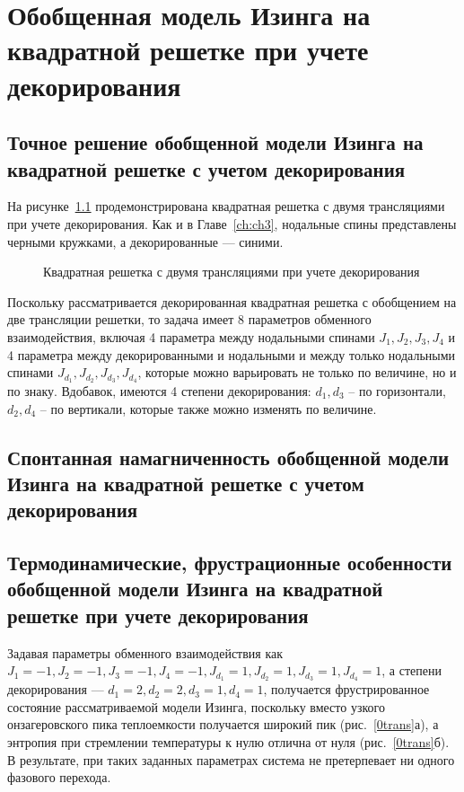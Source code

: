 \chapter{Обобщенная модель Изинга на квадратной решетке при учете декорирования}\label{ch:ch6}


\section{Точное решение обобщенной модели Изинга на квадратной решетке с учетом декорирования}

На рисунке~\ref{squareDecor} продемонстрирована квадратная решетка с двумя трансляциями при учете декорирования. Как и в Главе~\ref{ch:ch3}, нодальные спины представлены черными кружками, а декорированные --- синими. 

 \begin{figure}[h]
	\caption{Квадратная решетка с двумя трансляциями при учете декорирования}
	\label{squareDecor}
\end{figure}

Поскольку рассматривается декорированная квадратная решетка с обобщением на две трансляции решетки, то задача имеет 8 параметров обменного взаимодействия, включая 4 параметра между нодальными спинами $J_1, J_2, J_3, J_4$ и 4 параметра между декорированными и нодальными и между только нодальными спинами $J_{d_1}, J_{d_2}, J_{d_3}, J_{d_4}$, которые можно варьировать не только по величине, но и по знаку. Вдобавок, имеются 4 степени декорирования: $d_1, d_3$ -- по горизонтали, $d_2, d_4$ -- по вертикали, которые также можно изменять по величине. 


\section{Спонтанная намагниченность обобщенной модели Изинга на квадратной решетке с учетом декорирования}



\section{Термодинамические, фрустрационные особенности обобщенной модели Изинга на квадратной решетке при учете декорирования}

Задавая параметры обменного взаимодействия как $J_1 = -1, J_2 = -1, J_3 = -1, J_4 = -1, J_{d_1} = 1, J_{d_2} = 1, J_{d_3} = 1, J_{d_4} = 1$, а степени декорирования --- $d_1 = 2, d_2 = 2, d_3 = 1, d_4 = 1$, получается фрустрированное состояние рассматриваемой модели Изинга, поскольку вместо узкого онзагеровского пика теплоемкости получается широкий пик (рис.~\ref{0trans}а), а энтропия при стремлении температуры к нулю отлична от нуля (рис.~\ref{0trans}б). В результате, при таких заданных параметрах система не претерпевает ни одного фазового перехода.

